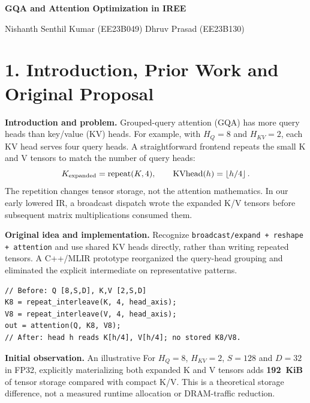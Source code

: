 \documentclass[10pt,a4paper]{article}
\begin{document}
\begin{center}
{\LARGE\bfseries GQA and Attention Optimization in IREE}\par
\vspace{6pt}
{\normalsize
Nishanth Senthil Kumar (EE23B049)
\quad
Dhruv Prasad (EE23B130)
}\par
\end{center}

\section*{1. Introduction, Prior Work and Original Proposal}
\textbf{Introduction and problem.} Grouped-query attention (GQA) has more query heads than key/value (KV) heads. For example, with $H_Q=8$ and $H_{KV}=2$, each KV head serves four query heads. A straightforward frontend repeats the small K and V tensors to match the number of query heads:
\[
K_{\rm expanded}=\operatorname{repeat}(K,4),\qquad
\mathrm{KVhead}(h)=\left\lfloor h/4\right\rfloor.
\]
The repetition changes tensor storage, not the attention mathematics. In our early lowered IR, a broadcast dispatch wrote the expanded K/V tensors before subsequent matrix multiplications consumed them.

\textbf{Original idea and implementation.} Recognize \texttt{broadcast/expand + reshape + attention} and use shared KV heads directly, rather than writing repeated tensors. A C++/MLIR prototype reorganized the query-head grouping and eliminated the explicit intermediate on representative patterns.
\begin{lstlisting}
// Before: Q [8,S,D], K,V [2,S,D]
K8 = repeat_interleave(K, 4, head_axis);
V8 = repeat_interleave(V, 4, head_axis);
out = attention(Q, K8, V8);
// After: head h reads K[h/4], V[h/4]; no stored K8/V8.
\end{lstlisting}
\textbf{Initial observation.} An illustrative For $H_Q=8$, $H_{KV}=2$, $S=128$ and $D=32$ in FP32,
explicitly materializing both expanded K and V tensors adds
\textbf{192~KiB} of tensor storage compared with compact K/V.
This is a theoretical storage difference, not a measured
runtime allocation or DRAM-traffic reduction.
\end{document}
